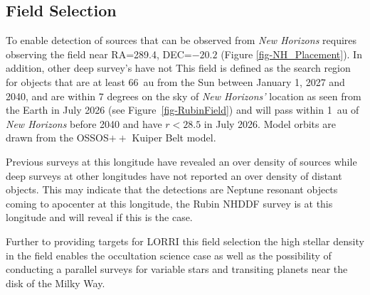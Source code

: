 \documentclass[modern,linenumbers,trackchanges,preprint]{aastex631}
\begin{document}
\subsection{Field Selection}
To enable detection of sources that can be observed from {\it New Horizons} requires observing the field near RA=289.4, DEC=$-20.2$ (Figure \ref{fig-NH_Placement}). 
In addition, other deep survey's have not 
This field is defined as the search region for objects that are at least 66~au from the Sun between January 1, 2027 and 2040, and are within 7 degrees on the sky of {\it New Horizons'} location as seen from the Earth in July 2026 (see Figure~\ref{fig-RubinField}) and will pass within 1~au of {\it New Horizons} before 2040 and have $r <28.5$ in July 2026. 
Model orbits are drawn from the OSSOS$++$ Kuiper Belt model. 

Previous surveys at this longitude have revealed an over density of sources while deep surveys at other longitudes \citep[e.g.][]{Napier2023} have not reported an over density of distant objects. This may indicate that the \citet{Fraser2024PSJ} detections are Neptune resonant objects coming to apocenter at this longitude, the Rubin NHDDF survey is at this longitude and will reveal if this is the case.

Further to providing targets for LORRI this field selection the high stellar density in the field enables the occultation science case as well as the possibility of conducting a parallel surveys for variable stars and transiting planets near the disk of the Milky Way.  
\end{document}
